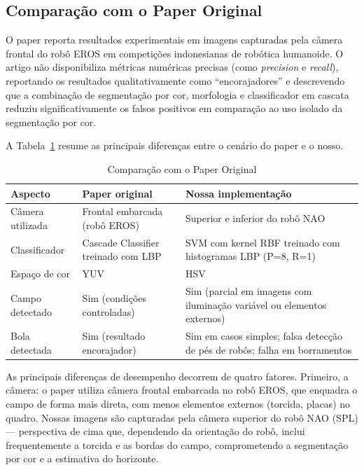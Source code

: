 \documentclass[journal]{IEEEtran}
\begin{document}
\subsection{Comparação com o Paper Original}

O paper \cite{nuruddin2018} reporta resultados experimentais em imagens capturadas pela câmera frontal do robô EROS em competições indonesianas de robótica humanoide. O artigo não disponibiliza métricas numéricas precisas (como \textit{precision} e \textit{recall}), reportando os resultados qualitativamente como ``encorajadores'' e descrevendo que a combinação de segmentação por cor, morfologia e classificador em cascata reduziu significativamente os falsos positivos em comparação ao uso isolado da segmentação por cor.

A Tabela~\ref{tab:comparacao} resume as principais diferenças entre o cenário do paper e o nosso.

\begin{table}[!t]
\renewcommand{\arraystretch}{1.3}
\caption{Comparação com o Paper Original}
\label{tab:comparacao}
\centering
\begin{tabular}{|l|p{2.6in}|p{2.6in}|}
\hline
\textbf{Aspecto} & \textbf{Paper original} & \textbf{Nossa implementação} \\
\hline
Câmera utilizada & Frontal embarcada (robô EROS) & Superior e inferior do robô NAO \\
\hline
Classificador & Cascade Classifier treinado com LBP & SVM com kernel RBF treinado com histogramas LBP (P=8, R=1) \\
\hline
Espaço de cor & YUV & HSV \\
\hline
Campo detectado & Sim (condições controladas) & Sim (parcial em imagens com iluminação variável ou elementos externos) \\
\hline
Bola detectada & Sim (resultado encorajador) & Sim em casos simples; falsa detecção de pés de robôs; falha em borramentos \\
\hline
\end{tabular}
\end{table}

As principais diferenças de desempenho decorrem de quatro fatores. Primeiro, a câmera: o paper utiliza câmera frontal embarcada no robô EROS, que enquadra o campo de forma mais direta, com menos elementos externos (torcida, placas) no quadro. Nossas imagens são capturadas pela câmera superior do robô NAO (SPL) — perspectiva de cima que, dependendo da orientação do robô, inclui frequentemente a torcida e as bordas do campo, comprometendo a segmentação por cor e a estimativa do horizonte.
\end{document}
